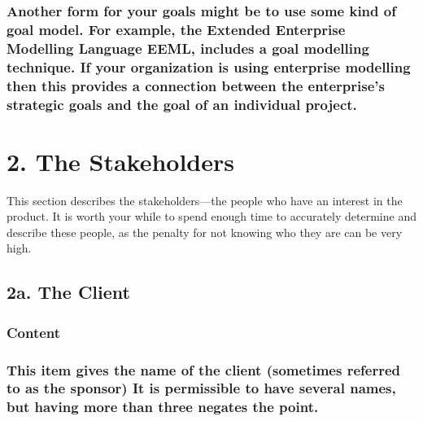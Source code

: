 \documentclass[
]{article}
\begin{document}
\hypertarget{another-form-for-your-goals-might-be-to-use-some-kind-of-goal-model.-for-example-the-extended-enterprise-modelling-language-eeml-includes-a-goal-modelling-technique.-if-your-organization-is-using-enterprise-modelling-then-this-provides-a-connection-between-the-enterprises-strategic-goals-and-the-goal-of-an-individual-project.}{%
\subsubsection{Another form for your goals might be to use some kind of
goal model. For example, the Extended Enterprise Modelling Language
EEML, includes a goal modelling technique. If your organization is using
enterprise modelling then this provides a connection between the
enterprise's strategic goals and the goal of an individual
project.}\label{another-form-for-your-goals-might-be-to-use-some-kind-of-goal-model.-for-example-the-extended-enterprise-modelling-language-eeml-includes-a-goal-modelling-technique.-if-your-organization-is-using-enterprise-modelling-then-this-provides-a-connection-between-the-enterprises-strategic-goals-and-the-goal-of-an-individual-project.}}

\hypertarget{the-stakeholders}{%
\section{2. The Stakeholders}\label{the-stakeholders}}

This section describes the stakeholders---the people who have an
interest in the product. It is worth your while to spend enough time to
accurately determine and describe these people, as the penalty for not
knowing who they are can be very high.

\hypertarget{a.-the-client}{%
\subsection{\texorpdfstring{2a. The Client
}{2a. The Client }}\label{a.-the-client}}

\hypertarget{content-2}{%
\subsubsection{Content}\label{content-2}}

\hypertarget{this-item-gives-the-name-of-the-client-sometimes-referred-to-as-the-sponsor-it-is-permissible-to-have-several-names-but-having-more-than-three-negates-the-point.}{%
\subsubsection{This item gives the name of the client (sometimes
referred to as the sponsor) It is permissible to have several names, but
having more than three negates the
point.}\label{this-item-gives-the-name-of-the-client-sometimes-referred-to-as-the-sponsor-it-is-permissible-to-have-several-names-but-having-more-than-three-negates-the-point.}}
\end{document}
